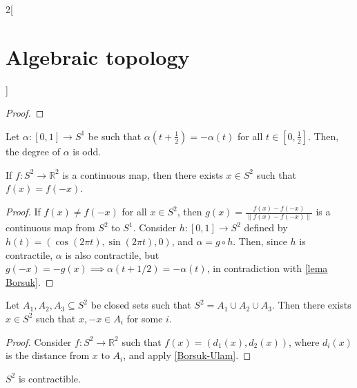 \documentclass[../../../main_math.tex]{subfiles}
\begin{document}
\begin{multicols}{2}[\section{Algebraic topology}]
\begin{proof}
	\end{proof}
	
	\begin{lemma} \label{lema Borsuk}
		Let $\alpha:[0,1]\to S^1$ be such that $\alpha(t+\frac{1}{2})=-\alpha(t)$ for all $t\in[0,\frac{1}{2}]$. Then, the degree of $\alpha$ is odd.
	\end{lemma}

	\begin{theorem}
		\label{Borsuk-Ulam}
		If $f:S^2 \to \mathbb{R}^2$ is a continuous map, then there exists $x\in S^2$ such that $f(x)=f(-x)$.
	\end{theorem}
	
	\begin{proof}
		If $f(x)\neq f(-x)$ for all $x\in S^2$, then $g(x)=\frac{f(x)-f(-x)}{\|f(x)-f(-x)\|}$ is a continuous map from $S^2$ to $S^1$. Consider $h:[0,1] \to S^2$ defined by $h(t)=(\cos(2\pi t), \sin(2\pi t), 0)$, and $\alpha = g \circ h$. Then, since $h$ is contractile, $\alpha$ is also contractile, but $g(-x)=-g(x)\implies \alpha(t+1/2)=-\alpha(t)$, in contradiction with \cref{lema Borsuk}.
	\end{proof}
	
	\begin{corollary}
		Let $A_1, A_2, A_3\subseteq S^2$ be closed sets such that $S^2=A_1\cup A_2 \cup A_3$. Then there exists $x\in S^2$ such that $x,-x \in A_i$ for some $i$.
	\end{corollary}

	\begin{proof}
		Consider $f: S^2 \to \mathbb{R}^2$ such that $f(x)=(d_1(x), d_2(x))$, where $d_i(x)$ is the distance from $x$ to $A_i$, and apply \cref{Borsuk-Ulam}.
	\end{proof}
	
	\begin{proposition}
		$S^2$ is contractible.
	\end{proposition}
	

\end{multicols}
\end{document}
